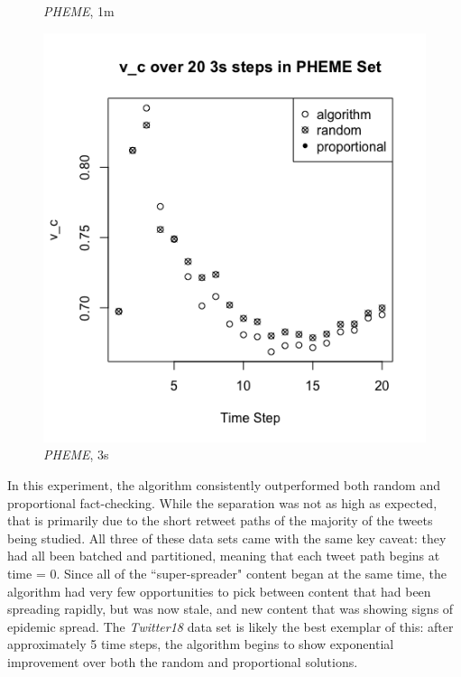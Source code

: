 \documentclass[preprint,12pt]{elsarticle}
\begin{document}
\begin{figure}[h]
      \caption{\textit{PHEME}, 1m}
    \label{fig:mu6 PHEME}
\endminipage\hfill
{}
  \includegraphics[width=\linewidth]{v_c pheme 3s.png}
    \caption{\textit{PHEME}, 3s}
    \label{fig:mu6 PHEME 3s}
\endminipage
\end{figure}

In this experiment, the algorithm consistently outperformed both random and proportional fact-checking. While the separation was not as high as expected, that is primarily due to the short retweet paths of the majority of the tweets being studied. All three of these data sets came with the same key caveat: they had all been batched and partitioned, meaning that each tweet path begins at time = 0. Since all of the ``super-spreader" content began at the same time, the algorithm had very few opportunities to pick between content that had been spreading rapidly, but was now stale, and new content that was showing signs of epidemic spread. The \textit{Twitter18} data set is likely the best exemplar of this: after approximately 5 time steps, the algorithm begins to show exponential improvement over both the random and proportional solutions. 
\end{document}
